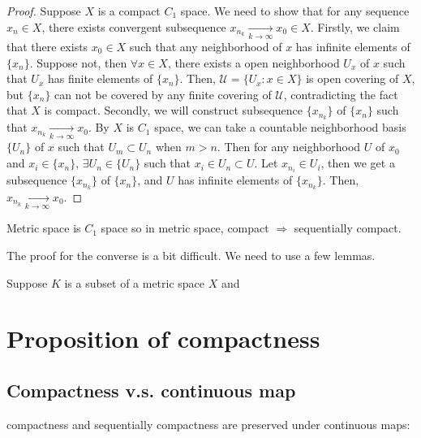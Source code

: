 \begin{proof}
    Suppose $X$ is a compact $C_1$ space. 
    We need to show that for any sequence ${x_n}\in X$, 
    there exists convergent subsequence $x_{n_k}\underset{k\rightarrow \infty}{\longrightarrow} x_0\in X$.
    Firstly, we claim that there exists $x_0\in X$ such that any neighborhood of $x$ has infinite elements of $\{x_n\}$. 
    Suppose not, then $\forall x\in X$, there exists a open neighborhood $U_x$ of $x$ such that $U_x$ has finite elements of $\{x_n\}$.
    Then, $\mathscr{U}=\{U_x:x\in X\}$ is open covering of $X$, but $\{x_n\}$ can not be covered by any finite covering of $\mathscr{U}$, 
    contradicting the fact that $X$ is compact.
    Secondly, we will construct subsequence $\{x_{n_k}\}$ of $\{x_n\}$ such that $x_{n_k}\underset{k\rightarrow \infty}{\longrightarrow} x_0$.
    By $X$ is $C_1$ space, we can take a countable neighborhood basis $\{U_n\}$ of $x$ such that $U_m\subset U_n$ when $m>n$.
    Then for any neighborhood $U$ of $x_0$ and $x_i\in \{x_n\}$, $\exists U_n\in \{U_n\}$ such that $x_i\in U_n\subset U$.
    Let $x_{n_i}\in U_i$, then we get a subsequence $\{x_{n_k}\}$ of $\{x_n\}$, and $U$ has infinite elements of $\{x_{n_k}\}$. 
    Then, $x_{n_k}\underset{k\rightarrow \infty}{\longrightarrow} x_0$.
\end{proof}

\begin{remark}
    Metric space is $C_1$ space so in metric space, compact $\Rightarrow$ sequentially compact.
\end{remark}

The proof for the converse is a bit difficult. We need to use a few lemmas.

\begin{lemma}{}{}
    Suppose $K$ is a subset of a metric space $X$ and 
\end{lemma}





\section{Proposition of compactness}
\subsection{Compactness v.s. continuous map}

compactness and sequentially compactness
are preserved under continuous maps:

